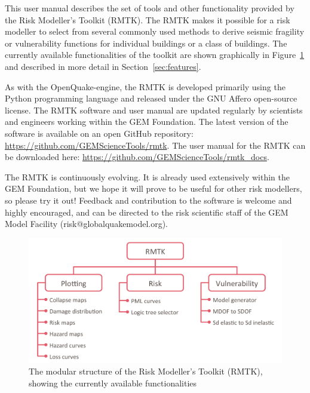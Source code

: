 This user manual describes the set of tools and other functionality provided by the Risk Modeller's Toolkit (RMTK). The RMTK makes it possible for a risk modeller to select from several commonly used methods to derive seismic fragility or vulnerability functions for individual buildings or a class of buildings. The currently available functionalities of the toolkit are shown graphically in Figure~\ref{fig:rmtk-structure} and described in more detail in Section~\ref{sec:features}.

As with the OpenQuake-engine, the RMTK is developed primarily using the Python programming language and released under the GNU Affero open-source license. The RMTK software and user manual are updated regularly by scientists and engineers working within the GEM Foundation. The latest version of the software is available on an open GitHub repository: \href{https://github.com/GEMScienceTools/rmtk}{https://github.com/GEMScienceTools/rmtk}. The user manual for the RMTK can be downloaded here: \href{https://github.com/GEMScienceTools/rmtk_docs}{https://github.com/GEMScienceTools/rmtk\_docs}.

The RMTK is continuously evolving. It is already used extensively within the GEM Foundation, but we hope it will prove to be useful for other risk modellers, so please try it out! Feedback and contribution to the software is welcome and highly encouraged, and can be directed to the risk scientific staff of the GEM Model Facility (risk@globalquakemodel.org).

\begin{figure}[!htbp]
	\centering
	\includegraphics[width=\textwidth]{figures/rmtk_structure.png}
	\caption{The modular structure of the Risk Modeller's Toolkit (RMTK), showing the currently available functionalities}
	\label{fig:rmtk-structure}
\end{figure}